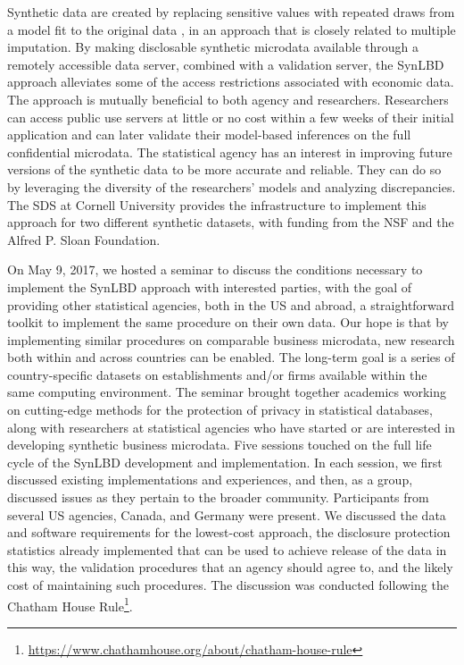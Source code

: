 \documentclass[letterpaper,12pt]{article}
\begin{document}
Synthetic data are created by replacing sensitive values with repeated draws from a model fit to the original data \citep{Little1993,Rubin1993}, in an approach that is closely related to multiple imputation. By making disclosable synthetic microdata available through a remotely accessible data server, combined with a validation server, the SynLBD approach alleviates some of the access restrictions associated with economic data. The approach is mutually beneficial to both agency and researchers. Researchers can access public use servers at little or no cost within a few weeks of their initial application and can later validate their model-based inferences on the full confidential microdata. The statistical agency  has an interest in improving future versions of the synthetic data to be more accurate and reliable. They can do so by leveraging the diversity of the researchers' models and analyzing discrepancies. The \ac{SDS} at Cornell University provides the infrastructure to implement this approach for two different synthetic datasets, with funding from the \ac{NSF} and the Alfred P. Sloan Foundation.

On May 9, 2017, we hosted a seminar to discuss the conditions necessary to implement the SynLBD approach with interested parties, with the goal of providing other statistical agencies, both in the US and abroad, a straightforward toolkit to implement the same procedure on their own data. Our hope is that by implementing similar procedures on comparable business microdata, new research both within and across countries can be enabled. The long-term goal is a series of country-specific datasets on establishments and/or firms available within the same computing environment.  The seminar brought together academics working on cutting-edge methods for the protection of privacy in statistical databases, along with researchers at statistical agencies who have started or are interested in developing synthetic business microdata. Five sessions touched on the full life cycle of the SynLBD development and implementation. In each session, we first discussed existing implementations and experiences, and then, as a group, discussed issues as they pertain to the broader community. Participants from several US agencies, Canada, and Germany were present. We discussed the data and software requirements for the lowest-cost approach, the disclosure protection statistics already implemented that can be used to achieve release of the data in this  way, the validation procedures that an agency should agree to, and the likely cost of maintaining such procedures. The discussion was conducted following the Chatham House Rule\footnote{\url{https://www.chathamhouse.org/about/chatham-house-rule}}.
\end{document}
